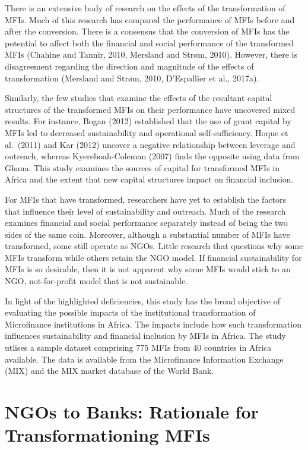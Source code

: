 \documentclass[a4paper, nobind]{templates/ociamthesis}
\begin{document}
There is an extensive body of research on the effects of the transformation of MFIs. Much of this research has compared the performance of MFIs before and after the conversion. There is a consensus that the conversion of MFIs has the potential to affect both the financial and social performance of the transformed MFIs (Chahine and Tannir, 2010, Mersland and Strøm, 2010). However, there is disagreement regarding the direction and magnitude of the effects of transformation (Mersland and Strøm, 2010, D'Espallier et al., 2017a).

Similarly, the few studies that examine the effects of the resultant capital structures of the transformed MFIs on their performance have uncovered mixed results. For instance, Bogan (2012) established that the use of grant capital by MFIs led to decreased sustainability and operational self-sufficiency. Hoque et al.~(2011) and Kar (2012) uncover a negative relationship between leverage and outreach, whereas Kyereboah-Coleman (2007) finds the opposite using data from Ghana. This study examines the sources of capital for transformed MFIs in Africa and the extent that new capital structures impact on financial inclusion.

For MFIs that have transformed, researchers have yet to establish the factors that influence their level of sustainability and outreach. Much of the research examines financial and social performance separately instead of being the two sides of the same coin. Moreover, although a substantial number of MFIs have transformed, some still operate as NGOs. Little research that questions why some MFIs transform while others retain the NGO model. If financial sustainability for MFIs is so desirable, then it is not apparent why some MFIs would stick to an NGO, not-for-profit model that is not sustainable.

In light of the highlighted deficiencies, this study has the broad objective of evaluating the possible impacts of the institutional transformation of Microfinance institutions in Africa. The impacts include how such transformation influences sustainability and financial inclusion by MFIs in Africa. The study utlises a sample dataset comprising 775 MFIs from 40 countries in Africa available. The data is available from the Microfinance Information Exchange (MIX) and the MIX market database of the World Bank.

\hypertarget{ngos-to-banks-rationale-for-transformationing-mfis}{%
\section{NGOs to Banks: Rationale for Transformationing MFIs}\label{ngos-to-banks-rationale-for-transformationing-mfis}}
\end{document}
